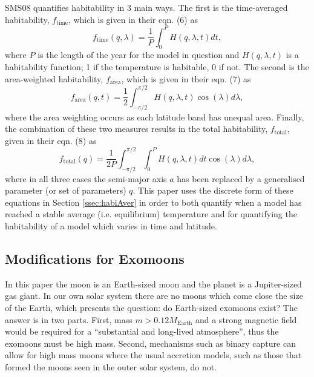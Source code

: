 \documentclass[12pt, onecolumn]{revtex4-2}    %
\begin{document}
SMS08 quantifies habitability in 3 main ways.
The first is the time-averaged habitability, $f_\text{time}$, which is given in their eqn. (6) as
\begin{equation}
  f_\text{time}(q, \lambda) = \frac{1}{P} \int_{0}^{P} H(q, \lambda, t) dt,
  \label{eqn:timeaverage}
\end{equation}
where $P$ is the length of the year for the model in question and $H(q, \lambda, t)$ is a habitability function; 1 if the temperature is habitable, 0 if not.
The second is the area-weighted habitability, $f_\text{area}$, which is given in their eqn. (7) as
\begin{equation}
  f_\text{area}(q, t) = \frac{1}{2} \int_{-\pi/2}^{\pi/2} H(q, \lambda, t) \cos(\lambda)d\lambda,
  \label{eqn:areaaverage}
\end{equation}
where the area weighting occurs as each latitude band has unequal area.
Finally, the combination of these two measures results in the total habitability, $f_\text{total}$, given in their eqn. (8) as
\begin{equation}
  f_\text{total}(q) = \frac{1}{2P} \int_{-\pi/2}^{\pi/2} \int_{0}^{P} H(q, \lambda, t) dt \cos(\lambda)d\lambda,
  \label{eqn:totalaverage}
\end{equation}
where in all three cases the semi-major axis $a$ has been replaced by a generalised parameter (or set of parameters) $q$.
This paper uses the discrete form of these equations in Section \ref{ssec:habiAver} in order to both quantify when a model has reached a stable average (i.e. equilibrium) temperature and for quantifying the habitability of a model which varies in time and latitude.

\subsection{Modifications for Exomoons} \label{ssec:ModificationsForExomoons}
In this paper the moon is an Earth-sized moon and the planet is a Jupiter-sized gas giant.
In our own solar system there are no moons which come close the size of the Earth, which presents the question: do Earth-sized exomoons exist?
The answer is in two parts.
First, mass $m > 0.12 M_\text{Earth}$ and a strong magnetic field \cite{WKW1997} would be required for a ``substantial and long-lived atmosphere'', thus the exomoons must be high mass.
Second, mechanisms such as binary capture \cite{Williams2013} can allow for high mass moons where the usual accretion models, such as those that formed the moons seen in the outer solar system, do not. 
\end{document}
